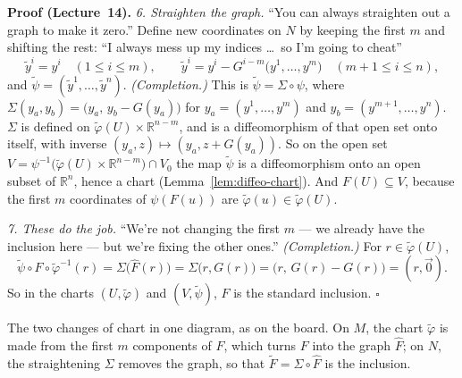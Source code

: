 \documentclass[11pt]{report}
\renewenvironment{proof}[1][Proof]{\noindent\textbf{#1.} }{\hfill$\square$\par\vspace{5pt}}
\begin{document}
\begin{proof}[Proof (Lecture~14)]
\emph{6. Straighten the graph.} ``You can always straighten out a graph to make it zero.'' Define new coordinates on $N$ by keeping the first $m$ and shifting the rest: ``I always mess up my indices \ldots\ so I'm going to cheat''
\[
\tilde y^i = y^i \quad (1 \le i \le m), \qquad \tilde y^i = y^i - G^{i-m}\big(y^1, \ldots, y^m\big) \quad (m+1 \le i \le n),
\]
and $\tilde\psi = (\tilde y^1, \ldots, \tilde y^n)$. \textit{(Completion.)} This is $\tilde\psi = \Sigma \circ \psi$, where $\Sigma(y_a, y_b) = \big(y_a, \, y_b - G(y_a)\big)$ for $y_a = (y^1, \ldots, y^m)$ and $y_b = (y^{m+1}, \ldots, y^n)$. $\Sigma$ is defined on $\tilde\varphi(U) \times \mathbb{R}^{n-m}$, and is a diffeomorphism of that open set onto itself, with inverse $(y_a, z) \mapsto (y_a, z + G(y_a))$. So on the open set $V = \psi^{-1}\big(\tilde\varphi(U) \times \mathbb{R}^{n-m}\big) \cap V_0$ the map $\tilde\psi$ is a diffeomorphism onto an open subset of $\mathbb{R}^n$, hence a chart (Lemma~\ref{lem:diffeo-chart}). And $F(U) \subseteq V$, because the first $m$ coordinates of $\psi(F(u))$ are $\tilde\varphi(u) \in \tilde\varphi(U)$.

\emph{7. These do the job.} ``We're not changing the first $m$ --- we already have the inclusion here --- but we're fixing the other ones.'' \textit{(Completion.)} For $r \in \tilde\varphi(U)$,
\[
\tilde\psi \circ F \circ \tilde\varphi^{-1}(r) = \Sigma\big(\hat F(r)\big) = \Sigma\big(r, G(r)\big) = \big(r, \, G(r) - G(r)\big) = (r, \vec 0) .
\]
So in the charts $(U, \tilde\varphi)$ and $(V, \tilde\psi)$, $F$ is the standard inclusion.
\end{proof}

\begin{center}
\end{center}

The two changes of chart in one diagram, as on the board. On $M$, the chart $\tilde\varphi$ is made from the first $m$ components of $F$, which turns $F$ into the graph $\hat F$; on $N$, the straightening $\Sigma$ removes the graph, so that $\tilde F = \Sigma \circ \hat F$ is the inclusion.
\end{document}
